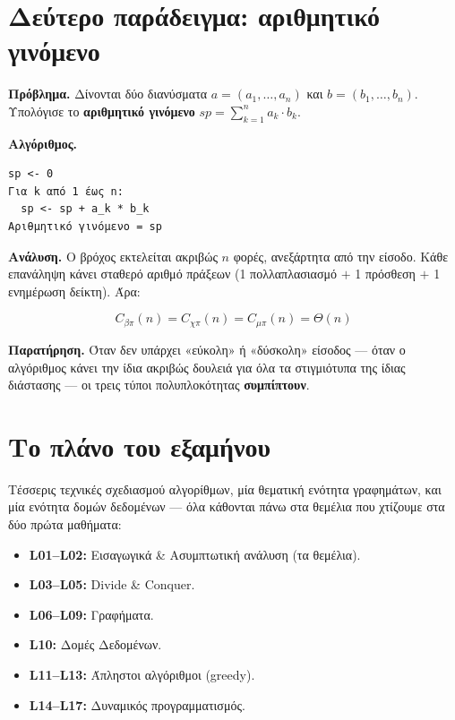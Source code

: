 \documentclass[11pt,a4paper]{article}
\begin{document}
\section{Δεύτερο παράδειγμα: αριθμητικό γινόμενο}

\begin{examplebox}
\textbf{Πρόβλημα.} Δίνονται δύο διανύσματα $a = (a_1, \dots, a_n)$ και
$b = (b_1, \dots, b_n)$. Υπολόγισε το \textbf{αριθμητικό γινόμενο}
$sp = \sum_{k=1}^n a_k \cdot b_k$.

\textbf{Αλγόριθμος.}
\begin{codebox}
\begin{verbatim}
sp <- 0
Για k από 1 έως n:
  sp <- sp + a_k * b_k
Αριθμητικό γινόμενο = sp
\end{verbatim}
\end{codebox}

\textbf{Ανάλυση.} Ο βρόχος εκτελείται ακριβώς $n$ φορές, ανεξάρτητα από την
είσοδο. Κάθε επανάληψη κάνει σταθερό αριθμό πράξεων (1 πολλαπλασιασμό $+$ 1
πρόσθεση $+$ 1 ενημέρωση δείκτη). Άρα:

\[
C_{\beta\pi}(n) = C_{\chi\pi}(n) = C_{\mu\pi}(n) = \Theta(n)
\]

\textbf{Παρατήρηση.} Όταν δεν υπάρχει «εύκολη» ή «δύσκολη» είσοδος --- όταν ο
αλγόριθμος κάνει την ίδια ακριβώς δουλειά για όλα τα στιγμιότυπα της ίδιας
διάστασης --- οι τρεις τύποι πολυπλοκότητας \textbf{συμπίπτουν}.
\end{examplebox}

\section{Το πλάνο του εξαμήνου}

Τέσσερις τεχνικές σχεδιασμού αλγορίθμων, μία θεματική ενότητα γραφημάτων, και μία
ενότητα δομών δεδομένων --- όλα κάθονται πάνω στα θεμέλια που χτίζουμε στα δύο
πρώτα μαθήματα:

\begin{itemize}
  \item \textbf{L01--L02:} Εισαγωγικά \& Ασυμπτωτική ανάλυση (τα θεμέλια).
  \item \textbf{L03--L05:} Divide \& Conquer.
  \item \textbf{L06--L09:} Γραφήματα.
  \item \textbf{L10:} Δομές Δεδομένων.
  \item \textbf{L11--L13:} Άπληστοι αλγόριθμοι (greedy).
  \item \textbf{L14--L17:} Δυναμικός προγραμματισμός.
\end{itemize}
\end{document}
